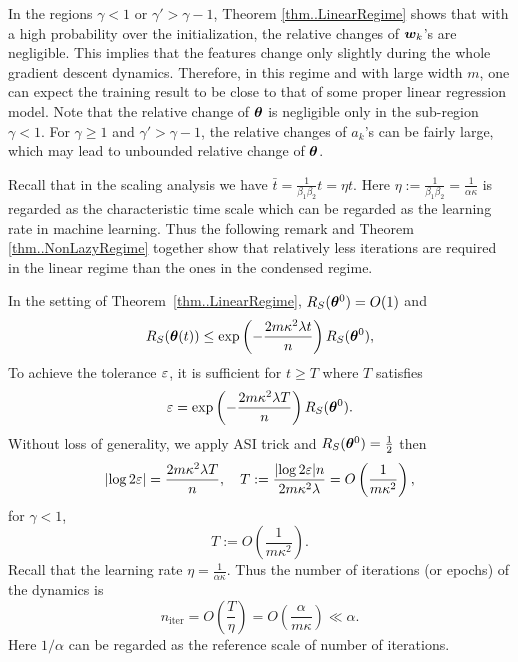 \documentclass{article}
\begin{document}
\begin{rmk}
    In the regions $\gamma<1$ or $\gamma'>\gamma-1$,
    Theorem \ref{thm..LinearRegime} shows that with a high probability over the initialization, the relative changes of $\bm{w}_k$'s are negligible. This implies that the features change only slightly during the whole gradient descent dynamics. Therefore, in this regime and with large width $m$, one can expect the training result to be close to that of some proper linear regression model. Note that the relative change of $\bm{\theta}$ is negligible only in the sub-region $\gamma<1$. For $\gamma\geq 1$ and $\gamma'>\gamma-1$, the relative changes of $a_k$'s can be fairly large, which may lead to unbounded relative change of $\bm{\theta}$.
\end{rmk}


Recall that in the scaling analysis we have $\bar{t}=\frac{1}{\beta_1\beta_2}t=\eta t$. Here $\eta:=\frac{1}{\beta_1\beta_2}=\frac{1}{\alpha\kappa}$ is regarded as the characteristic time scale which can be regarded as the learning rate in machine learning. Thus the following remark and Theorem \ref{thm..NonLazyRegime} together show that relatively less iterations are required in the linear regime than the ones in the condensed regime.
\begin{rmk}
    In the setting of Theorem~\ref{thm..LinearRegime}, $R_S(\bm{\theta}^0)=O(1)$ and
    \begin{equation}
        R_S(\bm{\theta}(t))\leq\exp\left(-\frac{2m\kappa^2\lambda t}{n}\right)R_S(\bm{\theta}^0),
    \end{equation}
    To achieve the tolerance $\varepsilon$, it is sufficient for $t\geq T$ where $T$ satisfies
    \begin{equation}
        \varepsilon=\exp\left(-\frac{2m\kappa^2\lambda T}{n}\right)R_S(\bm{\theta}^0).
    \end{equation}
    Without loss of generality, we apply ASI trick and $R_S(\bm{\theta}^0)=\frac{1}{2}$ then
    \begin{equation}
        \lvert\log 2\varepsilon\rvert=\frac{2m\kappa^2\lambda T}{n}, \quad T:=\frac{\lvert\log 2\varepsilon\rvert n}{2m\kappa^2\lambda}=O\left(\frac{1}{m\kappa^2}\right),
    \end{equation}
    for $\gamma<1$,
    \begin{equation}
        T:=O\left(\frac{1}{m\kappa^2}\right).
    \end{equation}
    Recall that the learning rate $\eta=\frac{1}{\alpha\kappa}$. Thus the number of iterations (or epochs) of the dynamics is
    \begin{equation}
        n_\mathrm{iter}=O\left(\frac{T}{\eta}\right)=O\left(\frac{\alpha}{m\kappa}\right)\ll \alpha.
    \end{equation}
    Here $1/\alpha$ can be regarded as the reference scale of number of iterations. 
\end{rmk}
\end{document}
